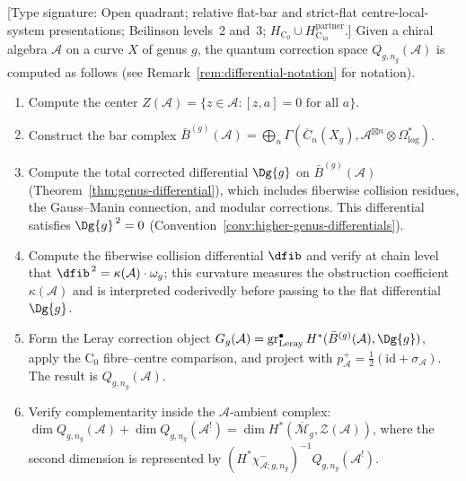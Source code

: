 \begin{remark}\label{rem:quantum-corrections}
\textup{[Type signature: Open quadrant; relative flat-bar and
strict-flat centre-local-system presentations; Beilinson levels~2
and~3; \(H_{\mathrm C_0}\cup
H_{\mathrm C_{1a}}^{\mathrm{partner}}\).]}
Given a chiral algebra $\mathcal{A}$ on a curve $X$ of genus $g$, the quantum correction space $Q_{g,n_g}(\mathcal{A})$ is computed as follows
(see Remark~\ref{rem:differential-notation} for notation).
\begin{enumerate}
\item Compute the center $Z(\mathcal{A}) = \{z \in \mathcal{A} : [z, a] = 0 \text{ for all } a\}$.
\item Construct the bar complex $\bar{B}^{(g)}(\mathcal{A}) = \bigoplus_n \Gamma(\overline{C}_n(X_g), \mathcal{A}^{\boxtimes n} \otimes \Omega^*_{\log})$.
\item Compute the total corrected differential $\Dg{g}$ on $\bar{B}^{(g)}(\mathcal{A})$
(Theorem~\ref{thm:genus-differential}), which includes fiberwise collision
residues, the Gauss--Manin connection, and modular corrections.
This differential satisfies $\Dg{g}^{\,2} = 0$ (Convention~\ref{conv:higher-genus-differentials}).
\item Compute the fiberwise collision differential $\dfib$ and verify
at chain level that $\dfib^{\,2} = \kappa(\mathcal{A}) \cdot \omega_g$;
this curvature measures the obstruction coefficient
$\kappa(\mathcal{A})$ and is interpreted coderivedly before passing to
the flat differential~$\Dg{g}$.
\item Form the Leray correction object
$G_g(\mathcal A)=\operatorname{gr}^{\bullet}_{\mathrm{Leray}}
H^*(\bar B^{(g)}(\mathcal A),\Dg{g})$, apply the \(\mathrm C_0\)
fibre--centre comparison, and project with
$p^+_{\mathcal A}=\tfrac12(\mathrm{id}+\sigma_{\mathcal A})$.  The
result is $Q_{g,n_g}(\mathcal A)$.
\item Verify complementarity inside the \(\mathcal A\)-ambient complex:
$\dim Q_{g,n_g}(\mathcal A)+\dim Q_{g,n_g}(\mathcal A^!)
=\dim H^*(\overline{\mathcal M}_g,\mathcal Z(\mathcal A))$,
where the second dimension is represented by
$(H^*\chi^-_{\mathcal A;g,n_g})^{-1}Q_{g,n_g}(\mathcal A^!)$.
\end{enumerate}
\end{remark}

